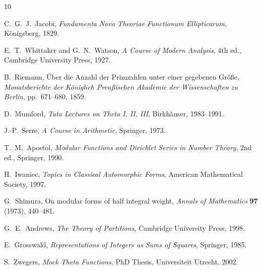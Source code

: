 \documentclass[12pt,a4paper]{amsart}
\theoremstyle{definition}
\begin{document}
\begin{thebibliography}{10}

C.~G.~J.~Jacobi,
\textit{Fundamenta Nova Theoriae Functionum Ellipticarum},
K\"onigsberg, 1829.

E.~T.~Whittaker and G.~N.~Watson,
\textit{A Course of Modern Analysis}, 4th ed.,
Cambridge University Press, 1927.

B.~Riemann,
\"{U}ber die Anzahl der Primzahlen unter einer gegebenen Gr\"o\ss e,
\textit{Monatsberichte der K\"oniglich Preu\ss ischen Akademie der Wissenschaften zu Berlin},
pp.\ 671--680, 1859.

D.~Mumford,
\textit{Tata Lectures on Theta I, II, III},
Birkh\"auser, 1983--1991.

J.-P.~Serre,
\textit{A Course in Arithmetic},
Springer, 1973.

T.~M.~Apostol,
\textit{Modular Functions and Dirichlet Series in Number Theory}, 2nd ed.,
Springer, 1990.

H.~Iwaniec,
\textit{Topics in Classical Automorphic Forms},
American Mathematical Society, 1997.

G.~Shimura,
On modular forms of half integral weight,
\textit{Annals of Mathematics} \textbf{97} (1973), 440--481.

G.~E.~Andrews,
\textit{The Theory of Partitions},
Cambridge University Press, 1998.

E.~Grosswald,
\textit{Representations of Integers as Sums of Squares},
Springer, 1985.

S.~Zwegers,
\textit{Mock Theta Functions},
PhD Thesis, Universiteit Utrecht, 2002.

\end{thebibliography}
\end{document}
